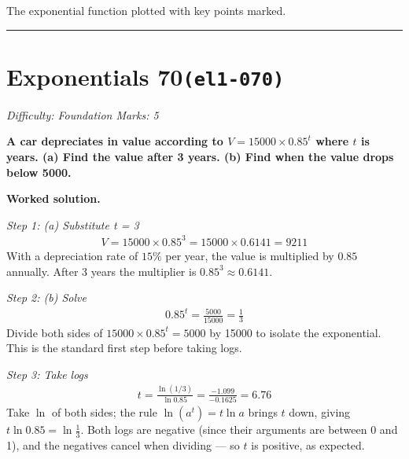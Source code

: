 \documentclass[11pt]{article}
\newcommand{\question}[1]{\par\medskip\noindent\textbf{#1}\par}
\begin{document}
\begin{center}
{
}
\end{center}
\small The exponential function plotted with key points marked.\normalsize

\medskip\hrule

\section*{Exponentials 70\quad\small\texttt{(el1-070)}}
\textit{Difficulty: Foundation \quad\textbar\quad Marks: 5}

\question{A car depreciates in value according to \( V = 15000 \times 0.85^t \) where \( t \) is years. (a) Find the value after 3 years. (b) Find when the value drops below 5000.}

\textbf{Worked solution.}

\textit{Step 1: (a) Substitute t = 3}
\[\begin{gathered}
V = 15000 \times 0.85^3 = 15000 \times 0.6141 = 9211
\end{gathered}\]
With a depreciation rate of \( 15\% \) per year, the value is multiplied by \( 0.85 \) annually. After 3 years the multiplier is \( 0.85^3 \approx 0.6141 \).

\textit{Step 2: (b) Solve}
\[\begin{gathered}
0.85^t = \frac{5000}{15000} = \frac{1}{3}
\end{gathered}\]
Divide both sides of \( 15000 \times 0.85^t = 5000 \) by 15000 to isolate the exponential. This is the standard first step before taking logs.

\textit{Step 3: Take logs}
\[\begin{gathered}
t = \frac{\ln(1/3)}{\ln 0.85} = \frac{-1.099}{-0.1625} = 6.76
\end{gathered}\]
Take \( \ln \) of both sides; the rule \( \ln(a^t) = t \ln a \) brings \( t \) down, giving \( t \ln 0.85 = \ln \tfrac{1}{3} \). Both logs are negative (since their arguments are between 0 and 1), and the negatives cancel when dividing --- so \( t \) is positive, as expected.
\end{document}

